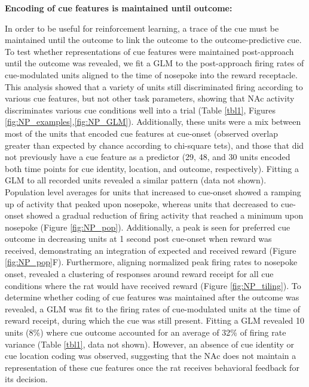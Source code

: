 \documentclass[11pt]{article}
\begin{document}
{\bf Encoding of cue features is maintained until outcome:}

In order to be useful for reinforcement learning, a trace of the cue must be maintained until the outcome to link the outcome to the outcome-predictive cue. To test whether representations of cue features were maintained post-approach until the outcome was revealed, we fit a GLM to the post-approach firing rates of cue-modulated units aligned to the time of nosepoke into the reward receptacle. This analysis showed that a variety of units still discriminated firing according to various cue features, but not other task parameters, showing that NAc activity discriminates various cue conditions well into a trial (Table \ref{tbl1}, Figures \ref{fig:NP_examples},\ref{fig:NP_GLM}). Additionally, these units were a mix between most of the units that encoded cue features at cue-onset (observed overlap greater than expected by chance according to chi-square tets), and those that did not previously have a cue feature as a predictor (29, 48, and 30 units encoded both time points for cue identity, location, and outcome, respectively). Fitting a GLM to all recorded units revealed a similar pattern (data not shown). Population level averages for units that increased to cue-onset showed a ramping up of activity that peaked upon nosepoke, whereas units that decreased to cue-onset showed a gradual reduction of firing activity that reached a minimum upon nosepoke (Figure \ref{fig:NP_pop}). Additionally, a peak is seen for preferred cue outcome in decreasing units at 1 second post cue-onset when reward was received, demonstrating an integration of expected and received reward (Figure \ref{fig:NP_pop}F). Furthermore, aligning normalized peak firing rates to nosepoke onset, revealed a clustering of responses around reward receipt for all cue conditions where the rat would have received reward (Figure \ref{fig:NP_tiling}). To determine whether coding of cue features was maintained after the outcome was revealed, a GLM was fit to the firing rates of cue-modulated units at the time of reward receipt, during which the cue was still present. Fitting a GLM revealed 10 units (8\%) where cue outcome accounted for an average of 32\% of firing rate variance (Table \ref{tbl1}, data not shown). However, an absence of cue identity or cue location coding was observed, suggesting that the NAc does not maintain a representation of these cue features once the rat receives behavioral feedback for its decision.
\end{document}
